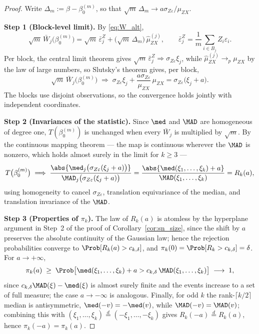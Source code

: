 \begin{proof}
Write $\Delta_m := \beta - \beta_0^{(m)}$, so that $\sqrt{m}\,\Delta_m \to a\sigma_{Z\varepsilon}/\mu_{ZX}$.

\medskip\noindent\textbf{Step 1 (Block-level limit).} By \eqref{eq:W_alt},
\[
  \sqrt{m}\,\bar{W}_j\bigl(\beta_0^{(m)}\bigr) = \sqrt{m}\,\bar{\varepsilon}_j^Z + \bigl(\sqrt{m}\,\Delta_m\bigr)\,\hat{\mu}_{ZX}^{(j)},
  \qquad \bar{\varepsilon}_j^Z = \frac{1}{m}\sum_{i\in B_j} Z_i\varepsilon_i.
\]
Per block, the central limit theorem gives $\sqrt{m}\,\bar{\varepsilon}_j^Z \Rightarrow \sigma_{Z\varepsilon}\xi_j$, while $\hat{\mu}_{ZX}^{(j)} \to_p \mu_{ZX}$ by the law of large numbers, so Slutsky's theorem gives, per block,
\[
  \sqrt{m}\,\bar{W}_j\bigl(\beta_0^{(m)}\bigr) \;\Longrightarrow\; \sigma_{Z\varepsilon}\xi_j + \frac{a\sigma_{Z\varepsilon}}{\mu_{ZX}}\,\mu_{ZX} = \sigma_{Z\varepsilon}\bigl(\xi_j + a\bigr).
\]
The blocks use disjoint observations, so the convergence holds jointly with independent coordinates.

\medskip\noindent\textbf{Step 2 (Invariances of the statistic).} Since $\med$ and $\MAD$ are homogeneous of degree one, $T(\beta_0^{(m)})$ is unchanged when every $\bar{W}_j$ is multiplied by $\sqrt{m}$. By the continuous mapping theorem --- the map is continuous wherever the $\MAD$ is nonzero, which holds almost surely in the limit for $k \ge 3$ ---
\[
  T\bigl(\beta_0^{(m)}\bigr) \;\Longrightarrow\;
  \frac{\abs{\med_j\bigl(\sigma_{Z\varepsilon}(\xi_j + a)\bigr)}}{\MAD_j\bigl(\sigma_{Z\varepsilon}(\xi_j + a)\bigr)}
  = \frac{\abs{\med(\xi_1,\dots,\xi_k) + a}}{\MAD(\xi_1,\dots,\xi_k)} = R_k(a),
\]
using homogeneity to cancel $\sigma_{Z\varepsilon}$, translation equivariance of the median, and translation invariance of the $\MAD$.

\medskip\noindent\textbf{Step 3 (Properties of $\pi_k$).} The law of $R_k(a)$ is atomless by the hyperplane argument in Step~2 of the proof of Corollary~\ref{cor:sn_size}, since the shift by $a$ preserves the absolute continuity of the Gaussian law; hence the rejection probabilities converge to $\Prob[R_k(a) > c_{k,\delta}]$, and $\pi_k(0) = \Prob[R_k > c_{k,\delta}] = \delta$. For $a \to +\infty$,
\[
  \pi_k(a) \;\ge\; \Prob\bigl[\med(\xi_1,\dots,\xi_k) + a > c_{k,\delta}\,\MAD(\xi_1,\dots,\xi_k)\bigr] \;\longrightarrow\; 1,
\]
since $c_{k,\delta}\MAD(\xi) - \med(\xi)$ is almost surely finite and the events increase to a set of full measure; the case $a \to -\infty$ is analogous. Finally, for odd $k$ the rank-$\lceil k/2\rceil$ median is antisymmetric, $\med(-v) = -\med(v)$, while $\MAD(-v) = \MAD(v)$; combining this with $(\xi_1,\dots,\xi_k) \overset{d}{=} (-\xi_1,\dots,-\xi_k)$ gives $R_k(-a) \overset{d}{=} R_k(a)$, hence $\pi_k(-a) = \pi_k(a)$.
\end{proof}

